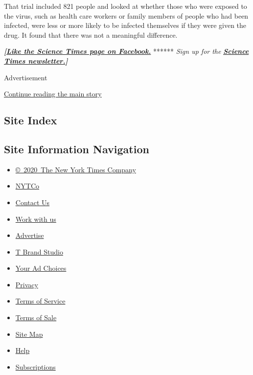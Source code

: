 That trial included 821 people and looked at whether those who were
exposed to the virus, such as health care workers or family members of
people who had been infected, were less or more likely to be infected
themselves if they were given the drug. It found that there was not a
meaningful difference.

\textbf{\emph{{[}}\href{http://on.fb.me/1paTQ1h}{\emph{Like the Science
Times page on Facebook.}}} ****** \emph{\textbar{} Sign up for the}
\textbf{\href{http://nyti.ms/1MbHaRU}{\emph{Science Times
newsletter.}}\emph{{]}}}

Advertisement

\protect\hyperlink{after-bottom}{Continue reading the main story}

\hypertarget{site-index}{%
\subsection{Site Index}\label{site-index}}

\hypertarget{site-information-navigation}{%
\subsection{Site Information
Navigation}\label{site-information-navigation}}

\begin{itemize}
\tightlist
\item
  \href{https://help.nytimes.com/hc/en-us/articles/115014792127-Copyright-notice}{©~2020~The
  New York Times Company}
\end{itemize}

\begin{itemize}
\tightlist
\item
  \href{https://www.nytco.com/}{NYTCo}
\item
  \href{https://help.nytimes.com/hc/en-us/articles/115015385887-Contact-Us}{Contact
  Us}
\item
  \href{https://www.nytco.com/careers/}{Work with us}
\item
  \href{https://nytmediakit.com/}{Advertise}
\item
  \href{http://www.tbrandstudio.com/}{T Brand Studio}
\item
  \href{https://www.nytimes.com/privacy/cookie-policy\#how-do-i-manage-trackers}{Your
  Ad Choices}
\item
  \href{https://www.nytimes.com/privacy}{Privacy}
\item
  \href{https://help.nytimes.com/hc/en-us/articles/115014893428-Terms-of-service}{Terms
  of Service}
\item
  \href{https://help.nytimes.com/hc/en-us/articles/115014893968-Terms-of-sale}{Terms
  of Sale}
\item
  \href{https://spiderbites.nytimes.com}{Site Map}
\item
  \href{https://help.nytimes.com/hc/en-us}{Help}
\item
  \href{https://www.nytimes.com/subscription?campaignId=37WXW}{Subscriptions}
\end{itemize}
